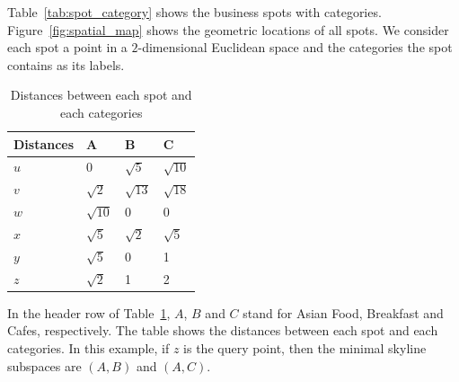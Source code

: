 Table~\ref{tab:spot_category} shows the business spots with categories. Figure~\ref{fig:spatial_map} shows the geometric locations of all spots. We consider each spot a point in a $2$-dimensional Euclidean space and the categories the spot contains as its labels.

\begin{table}[H]
    \centering
    \begin{tabular}{llll}
    \hline
    Distances & A & B & C \\ \hline
    $u$       & 0 & $\sqrt{5}$ & $\sqrt{10}$ \\ \hline
    $v$       & $\sqrt{2}$ & $\sqrt{13}$ & $\sqrt{18}$ \\ \hline
    $w$       & $\sqrt{10}$ & 0 & 0 \\ \hline
    $x$       & $\sqrt{5}$ & $\sqrt{2}$ & $\sqrt{5}$ \\ \hline
    $y$       & $\sqrt{5}$ & 0 & 1 \\ \hline
    $z$       & $\sqrt{2}$ & 1 & 2 \\ \hline
    \end{tabular}
    \caption{\label{tab:distances_spatial} Distances between each spot and each categories}
\end{table}

In the header row of Table~\ref{tab:distances_spatial}, $A$, $B$ and $C$ stand for Asian Food, Breakfast and Cafes, respectively. The table shows the distances between each spot and each categories. In this example, if $z$ is the query point, then the minimal skyline subspaces are $(A, B)$ and $(A, C)$.


